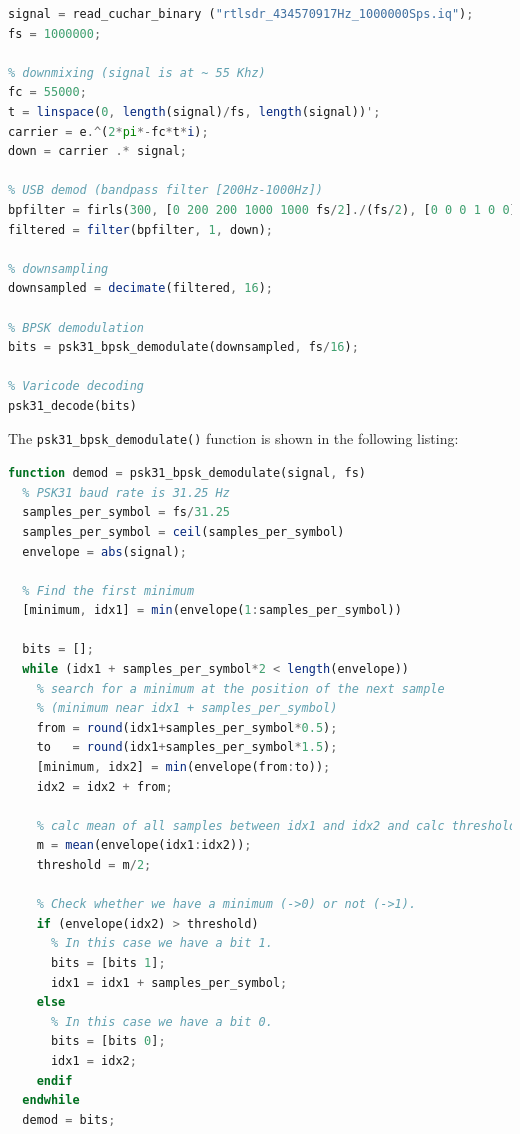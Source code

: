 \begin{lstlisting}[label=lst:octave_psk31, caption=Octave implementation of the PSK31 demodulator, language=octave]
% load signal
signal = read_cuchar_binary ("rtlsdr_434570917Hz_1000000Sps.iq");
fs = 1000000;

% downmixing (signal is at ~ 55 Khz)
fc = 55000;
t = linspace(0, length(signal)/fs, length(signal))';
carrier = e.^(2*pi*-fc*t*i);
down = carrier .* signal;

% USB demod (bandpass filter [200Hz-1000Hz])
bpfilter = firls(300, [0 200 200 1000 1000 fs/2]./(fs/2), [0 0 0 1 0 0]);
filtered = filter(bpfilter, 1, down);

% downsampling
downsampled = decimate(filtered, 16);

% BPSK demodulation
bits = psk31_bpsk_demodulate(downsampled, fs/16);

% Varicode decoding
psk31_decode(bits)
\end{lstlisting}

The \texttt{psk31\_bpsk\_demodulate()} function is shown in the following listing:

\begin{lstlisting}[label=lst:octave_psk31_bpsk, caption=Octave implementation of the BPSK demodulation, language=octave]
function demod = psk31_bpsk_demodulate(signal, fs)
  % PSK31 baud rate is 31.25 Hz
  samples_per_symbol = fs/31.25
  samples_per_symbol = ceil(samples_per_symbol)
  envelope = abs(signal);
  
  % Find the first minimum
  [minimum, idx1] = min(envelope(1:samples_per_symbol))
  
  bits = [];
  while (idx1 + samples_per_symbol*2 < length(envelope))
    % search for a minimum at the position of the next sample
    % (minimum near idx1 + samples_per_symbol)
    from = round(idx1+samples_per_symbol*0.5);
    to   = round(idx1+samples_per_symbol*1.5);
    [minimum, idx2] = min(envelope(from:to));
    idx2 = idx2 + from;
    
    % calc mean of all samples between idx1 and idx2 and calc threshold = mean/2
    m = mean(envelope(idx1:idx2));
    threshold = m/2;
    
    % Check whether we have a minimum (->0) or not (->1).
    if (envelope(idx2) > threshold)
      % In this case we have a bit 1.
      bits = [bits 1];
      idx1 = idx1 + samples_per_symbol;
    else
      % In this case we have a bit 0.
      bits = [bits 0];
      idx1 = idx2;
    endif
  endwhile
  demod = bits;
\end{lstlisting}

